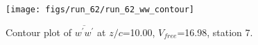 \begin{figure}[H]
\centering
\texttt{[image: figs/run\_62/run\_62\_ww\_contour]}
\caption{Contour plot of $\overline{w^\prime w^\prime}$ at $z/c$=10.00, $V_{free}$=16.98, station 7.}
\end{figure}


